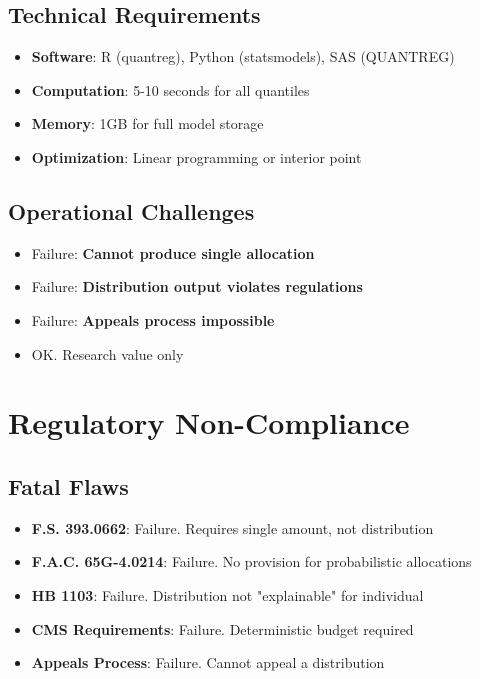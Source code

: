 \subsection{Technical Requirements}

\begin{itemize}
    \item \textbf{Software}: R (quantreg), Python (statsmodels), SAS (QUANTREG)
    \item \textbf{Computation}: 5-10 seconds for all quantiles
    \item \textbf{Memory}: 1GB for full model storage
    \item \textbf{Optimization}: Linear programming or interior point
\end{itemize}

\subsection{Operational Challenges}

\begin{itemize}
    \item Failure:  \textbf{Cannot produce single allocation}
    \item Failure:  \textbf{Distribution output violates regulations}
    \item Failure:  \textbf{Appeals process impossible}
    \item OK.  Research value only
\end{itemize}

\section{Regulatory Non-Compliance}

\subsection{Fatal Flaws}

\begin{itemize}
    \item[\redcross] \textbf{F.S. 393.0662}: Failure.  Requires single amount, not distribution
    \item[\redcross] \textbf{F.A.C. 65G-4.0214}: Failure.  No provision for probabilistic allocations
    \item[\redcross] \textbf{HB 1103}: Failure.  Distribution not "explainable" for individual
    \item[\redcross] \textbf{CMS Requirements}: Failure.  Deterministic budget required
    \item[\redcross] \textbf{Appeals Process}: Failure.  Cannot appeal a distribution
\end{itemize}

